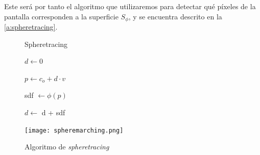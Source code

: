 Este será por tanto el algoritmo que utilizaremos para detectar qué píxeles de la pantalla corresponden a la superficie $S_{\phi}$, y se encuentra descrito en la \autoref{a:spheretracing}. 
\begin{figure}[ht!]
    \centering
    \begin{minipage}{0.50\textwidth}
       \begin{algorithm}[H]
            \caption{Spheretracing}
                $d \gets 0$ 
                
                 {
                    $p \gets c_o + d \cdot v$
                    
                    sdf $\gets \phi(p)$
                    
            
                    $d \gets$ d + sdf
            
                }
        \end{algorithm}
    \end{minipage}%
    \hfill
    \begin{minipage}{0.48\textwidth}
        \texttt{[image: spheremarching.png]}
    \end{minipage}
    \caption{Algoritmo de \textit{spheretracing}}
    \label{a:spheretracing}
\end{figure}